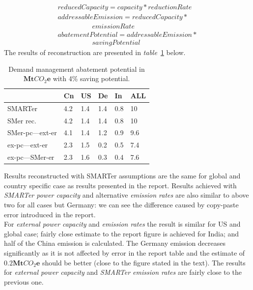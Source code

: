 \documentclass[11pt, twocolumn]{article}
\begin{document}
\begin{gather*}
  reducedCapacity = capacity * reductionRate\\
  addressableEmission = reducedCapacity *\\
  \quad\quad\quad\quad\quad emissionRate\\
  abatementPotential = addressableEmission *\\
  \quad\quad\quad\quad\quad savingPotential
\end{gather*}
The results of reconstruction are presented in \emph{table}~\ref{tab:dm} below.
\begin{center}
  \begin{table}[h]
    \begin{tabular}{ p{} | p{} | p{} | p{} | p{} | p{} }
       & Cn & US & De & In & ALL \\
      \hline
      SMARTer & 4.2 & 1.4 & 1.4 & 0.8 & 10 \\
      SMer rec. & 4.2 & 1.4 & 1.4 & 0.8 & 10 \\
      SMer-pc---ext-er & 4.1 & 1.4 & 1.2 & 0.9 & 9.6 \\
      ex-pc---ext-er & 2.3 & 1.5 & 0.2 & 0.5 & 7.4 \\
      ex-pc---SMer-er & 2.3 & 1.6 & 0.3 & 0.4 & 7.6
    \end{tabular}
    \caption{Demand management abatement potential in $\mathbf{Mt}CO_2\mathbf{e}$ with 4\% saving potential. \label{tab:dm}}
  \end{table}
\end{center}
Results reconstructed with SMARTer assumptions are the same for global and country specific case as results presented in the report. Results achieved with \emph{SMARTer power capacity} and alternative \emph{emission rates} are also similar to above two for all cases but Germany: we can see the difference caused by copy-paste error introduced in the report.\\
For \emph{external power capacity} and \emph{emission rates} the result is similar for US and global case; fairly close estimate to the report figure is achieved for India; and half of the China emission is calculated. The Germany emission decreases significantly as it is not affected by error in the report table and the estimate of $\mathbf{0.2Mt}CO_2\mathbf{e}$ should be better (close to the figure stated in the text). The results for \emph{external power capacity} and \emph{SMARTer emission rates} are fairly close to the previous one.
\end{document}
